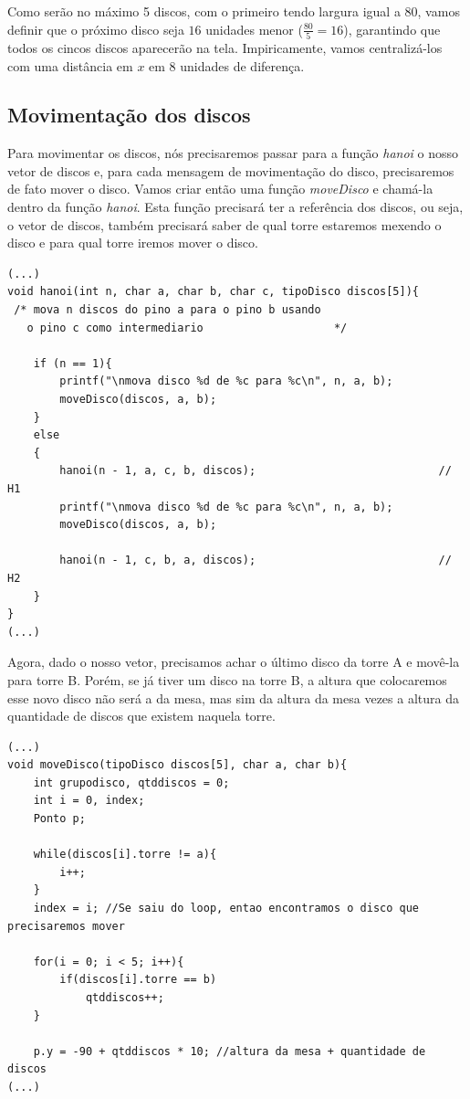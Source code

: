 Como serão no máximo 5 discos, com o primeiro tendo largura igual a $80$, vamos definir que o próximo disco seja $16$ unidades menor ($\frac{80}{5} = 16$), garantindo que todos os cincos discos aparecerão na tela. Impiricamente, vamos centralizá-los com uma distância em $x$ em $8$ unidades de diferença.

%


\subsection{Movimentação dos discos}
Para movimentar os discos, nós precisaremos passar para a função \emph{hanoi} o nosso vetor de discos e, para cada mensagem de movimentação do disco, precisaremos de fato mover o disco. Vamos criar então uma função \emph{moveDisco} e chamá-la dentro da função \emph{hanoi}. Esta função precisará ter a referência dos discos, ou seja, o vetor de discos, também precisará saber de qual torre estaremos mexendo o disco e para qual torre iremos mover o disco.

 \begin{lstlisting}[caption={Como a função \emph{moveDisco} será chamada.}, style=tuto] 
 (...)
void hanoi(int n, char a, char b, char c, tipoDisco discos[5]){
 /* mova n discos do pino a para o pino b usando
   o pino c como intermediario                    */

    if (n == 1){
        printf("\nmova disco %d de %c para %c\n", n, a, b);
        moveDisco(discos, a, b);
    }
    else
    {
        hanoi(n - 1, a, c, b, discos);                            // H1
        printf("\nmova disco %d de %c para %c\n", n, a, b);
        moveDisco(discos, a, b);

        hanoi(n - 1, c, b, a, discos);                            // H2
    }
}
(...)
\end{lstlisting}

Agora, dado o nosso vetor, precisamos achar o último disco da torre A e movê-la para torre B. Porém, se já tiver um disco na torre B, a altura que colocaremos esse novo disco não será a da mesa, mas sim da altura da mesa vezes a altura da quantidade de discos que existem naquela torre.

 \begin{lstlisting}[caption={Determinando a posição em $y$ do disco.}, style=tuto] 
 (...)
void moveDisco(tipoDisco discos[5], char a, char b){
    int grupodisco, qtddiscos = 0;
    int i = 0, index;
    Ponto p;

    while(discos[i].torre != a){
        i++;
    }
    index = i; //Se saiu do loop, entao encontramos o disco que precisaremos mover

    for(i = 0; i < 5; i++){
        if(discos[i].torre == b)
            qtddiscos++;
    }

    p.y = -90 + qtddiscos * 10; //altura da mesa + quantidade de discos
(...)
\end{lstlisting}

